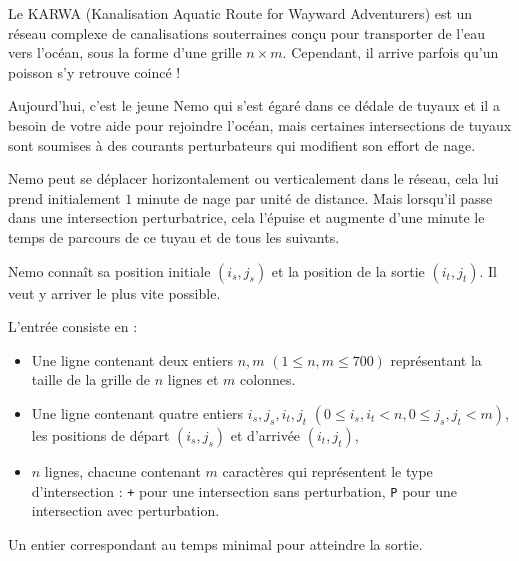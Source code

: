\problemname{\problemyamlname{}}


Le KARWA (Kanalisation Aquatic Route for Wayward Adventurers) est un réseau complexe de canalisations souterraines conçu pour transporter de l'eau vers l'océan, sous la forme d'une grille $n \times m$. Cependant, il arrive parfois qu'un poisson s'y retrouve coincé !

Aujourd'hui, c'est le jeune Nemo qui s'est égaré dans ce dédale de tuyaux et il a besoin de votre aide pour rejoindre l'océan, mais certaines intersections de tuyaux sont soumises à des courants perturbateurs qui modifient son effort de nage.

Nemo peut se déplacer horizontalement ou verticalement dans le réseau, cela lui prend initialement $1$ minute de nage par unité de distance. Mais lorsqu'il passe dans une intersection perturbatrice, cela l'épuise et augmente d'une minute le temps de parcours de ce tuyau et de tous les suivants.

Nemo connaît sa position initiale $(i_s, j_s)$ et la position de la sortie $(i_t, j_t)$. Il veut y arriver le plus vite possible.

\begin{Input}
    L'entrée consiste en :
    \begin{itemize}
        \item Une ligne contenant deux entiers $n, m$ $(1 \leq n, m \leq 700)$ représentant la taille de la grille de $n$ lignes et $m$ colonnes.
        \item Une ligne contenant quatre entiers $i_s, j_s, i_t, j_t$ $(0 \leq i_s, i_t < n, 0 \leq j_s, j_t < m)$, les positions de départ $(i_s,j_s)$ et d'arrivée $(i_t,j_t)$,
        \item $n$ lignes, chacune contenant $m$ caractères qui représentent le type d'intersection : \texttt{+} pour une intersection sans perturbation, \texttt{P} pour une intersection avec perturbation.
    \end{itemize}
\end{Input}

\begin{Output}
    Un entier correspondant au temps minimal pour atteindre la sortie.
\end{Output}